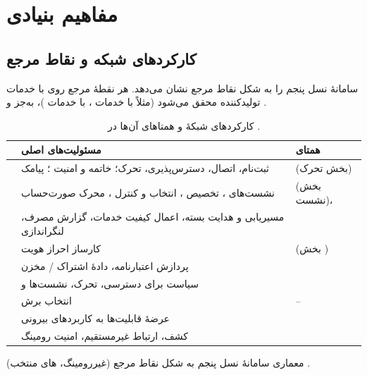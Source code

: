 \documentclass[11pt,a4paper]{article}
\begin{document}
\section{مفاهیم بنیادی}

\subsection{کارکردهای شبکه و نقاط مرجع}
 سامانهٔ نسل پنجم را به شکل نقاط مرجع نشان می‌دهد. هر نقطهٔ مرجع روی  با خدمات تولیدکننده محقق
می‌شود (مثلاً  با خدمات ،  با خدمات )، به‌جز  و .
\begin{table}[htbp]
\centering\small
\caption{کارکردهای شبکهٔ  و همتاهای آن‌ها در .}\label{tab:map}
\begin{tabularx}{\linewidth}{@{}l Y l@{}}
\toprule
{} & مسئولیت‌های اصلی & همتای  \\
\midrule
{}  & ثبت‌نام، اتصال، دسترس‌پذیری، تحرک؛ خاتمه و امنیت ؛ پیامک &  (بخش تحرک) \\
  & نشست‌های ، تخصیص ، انتخاب و کنترل ، محرک صورت‌حساب &  (بخش نشست)،  \\
  & مسیریابی و هدایت بسته، اعمال کیفیت خدمات، گزارش مصرف، لنگراندازی &  \\
 & کارساز احراز هویت                                  &  (بخش ) \\
 & پردازش اعتبارنامه، دادهٔ اشتراک / مخزن             &  \\
  & سیاست برای دسترسی، تحرک، نشست‌ها و        &  \\
 & انتخاب برش                                          & -- \\
  & عرضهٔ قابلیت‌ها به کاربردهای بیرونی                 &  \\
 & کشف، ارتباط غیرمستقیم، امنیت رومینگ        &  \\
\bottomrule
\end{tabularx}
\end{table}

\begin{acnfigure}
  \caption{معماری سامانهٔ نسل پنجم به شکل نقاط مرجع (غیررومینگ، های منتخب) \cite{ts23501}.}
  \label{fig:ref}
\end{acnfigure}
\end{document}
